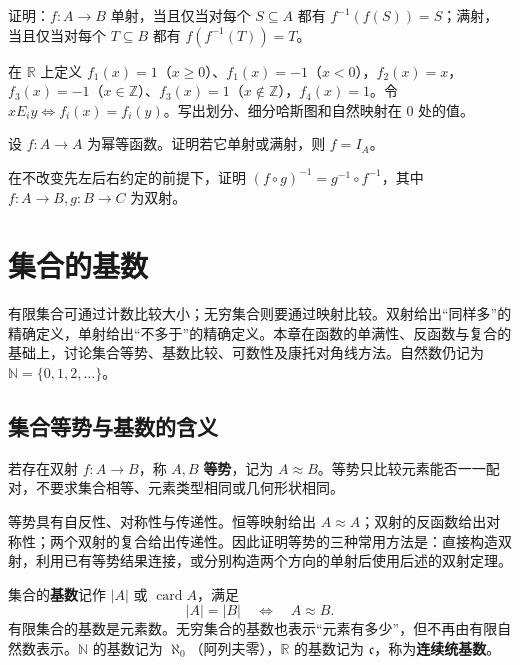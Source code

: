 \documentclass[UTF8,fontset=none,zihao=-4,a4paper]{ctexart}
\newcommand{\chapterpage}[1]{\clearpage\section{#1}}
\newcommand{\term}[1]{\textbf{#1}}
\begin{document}
\begin{enumerate}[label=8.\arabic*.,leftmargin=2.8em]
\begin{samepage}
\item  证明：$f:A\to B$ 单射，当且仅当对每个 $S\subseteq A$ 都有 $f^{-1}(f(S))=S$；满射，当且仅当对每个 $T\subseteq B$ 都有 $f(f^{-1}(T))=T$。
\end{samepage}

\begin{samepage}
\item  在 $\mathbb R$ 上定义 $f_1(x)=1$（$x\ge0$）、$f_1(x)=-1$（$x<0$），$f_2(x)=x$，$f_3(x)=-1$（$x\in\mathbb Z$）、$f_3(x)=1$（$x\notin\mathbb Z$），$f_4(x)=1$。令 $xE_i y\Longleftrightarrow f_i(x)=f_i(y)$。写出划分、细分哈斯图和自然映射在 $0$ 处的值。
\end{samepage}

\begin{samepage}
\item  设 $f:A\to A$ 为幂等函数。证明若它单射或满射，则 $f=I_A$。
\end{samepage}

\begin{samepage}
\item  在不改变先左后右约定的前提下，证明 $(f\circ g)^{-1}=g^{-1}\circ f^{-1}$，其中 $f:A\to B,g:B\to C$ 为双射。
\end{samepage}
\end{enumerate}




\chapterpage{集合的基数}
有限集合可通过计数比较大小；无穷集合则要通过映射比较。双射给出“同样多”的精确定义，单射给出“不多于”的精确定义。本章在函数的单满性、反函数与复合的基础上，讨论集合等势、基数比较、可数性及康托对角线方法。自然数仍记为 $\mathbb N=\{0,1,2,\ldots\}$。

\subsection{集合等势与基数的含义}
若存在双射 $f:A\to B$，称 $A,B$ \term{等势}，记为 $A\approx B$。等势只比较元素能否一一配对，不要求集合相等、元素类型相同或几何形状相同。

等势具有自反性、对称性与传递性。恒等映射给出 $A\approx A$；双射的反函数给出对称性；两个双射的复合给出传递性。因此证明等势的三种常用方法是：直接构造双射，利用已有等势结果连接，或分别构造两个方向的单射后使用后述的双射定理。

集合的\term{基数}记作 $|A|$ 或 $\operatorname{card}A$，满足
\[
|A|=|B|\quad\Longleftrightarrow\quad A\approx B.
\]
有限集合的基数是元素数。无穷集合的基数也表示“元素有多少”，但不再由有限自然数表示。$\mathbb N$ 的基数记为 $\aleph_0$（阿列夫零），$\mathbb R$ 的基数记为 $\mathfrak c$，称为\term{连续统基数}。
\end{document}
